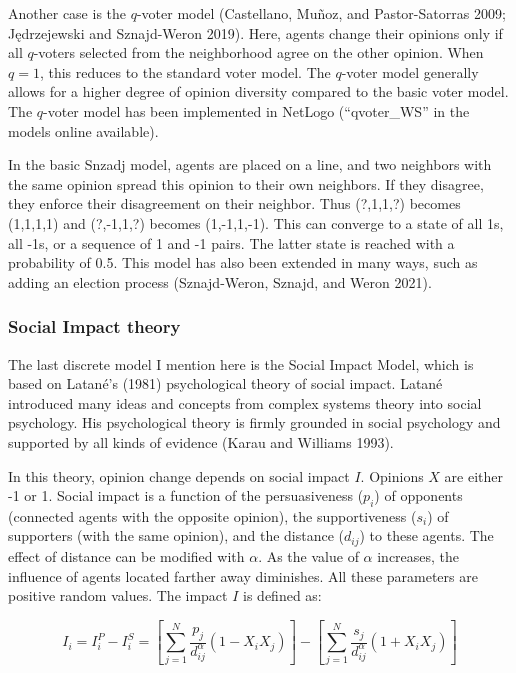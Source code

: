 \documentclass[
  a4paper,
  DIV=11,
  numbers=noendperiod,
  oneside]{scrreprt}
\begin{document}
Another case is the \(q\)-voter model (Castellano, Muñoz, and
Pastor-Satorras 2009; Jędrzejewski and Sznajd-Weron 2019). Here, agents
change their opinions only if all \(q\)-voters selected from the
neighborhood agree on the other opinion. When \(q = 1\), this reduces to
the standard voter model. The \(q\)-voter model generally allows for a
higher degree of opinion diversity compared to the basic voter model.
The \(q\)-voter model has been implemented in NetLogo (``qvoter\_WS'' in
the models online available).

In the basic Snzadj model, agents are placed on a line, and two
neighbors with the same opinion spread this opinion to their own
neighbors. If they disagree, they enforce their disagreement on their
neighbor. Thus (?,1,1,?) becomes (1,1,1,1) and (?,-1,1,?) becomes
(1,-1,1,-1). This can converge to a state of all 1s, all -1s, or a
sequence of 1 and -1 pairs. The latter state is reached with a
probability of 0.5. This model has also been extended in many ways, such
as adding an election process (Sznajd-Weron, Sznajd, and Weron 2021).

\hypertarget{sec-Social-Impact-theory}{%
\subsubsection{Social Impact theory}\label{sec-Social-Impact-theory}}

The last discrete model I mention here is the Social Impact Model, which
is based on Latané's (1981) psychological theory of social impact.
Latané introduced many ideas and concepts from complex systems theory
into social psychology. His psychological theory is firmly grounded in
social psychology and supported by all kinds of evidence (Karau and
Williams 1993).

In this theory, opinion change depends on social impact \(I\). Opinions
\(X\) are either -1 or 1. Social impact is a function of the
persuasiveness (\(p_{i}\)) of opponents (connected agents with the
opposite opinion), the supportiveness (\(s_{i}\)) of supporters (with
the same opinion), and the distance (\(d_{ij}\)) to these agents. The
effect of distance can be modified with \(\alpha\). As the value of
\(\alpha\) increases, the influence of agents located farther away
diminishes. All these parameters are positive random values. The impact
\(I\) is defined as:

\[I_{i} = I_{i}^{P} - I_{i}^{S} = \left\lbrack \sum_{j = 1}^{N}{\frac{p_{j}}{d_{ij}^{\alpha}}\left( 1 - X_{i}X_{j} \right)} \right\rbrack - \left\lbrack \sum_{j = 1}^{N}{\frac{s_{j}}{d_{ij}^{\alpha}}\left( 1 + X_{i}X_{j} \right)} \right\rbrack\]
\end{document}
